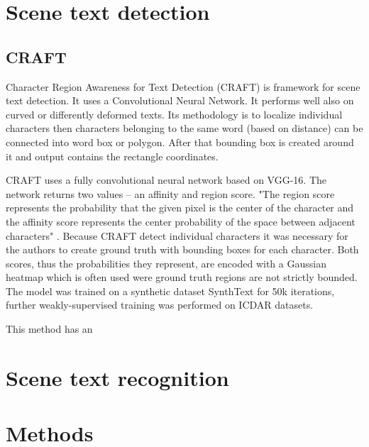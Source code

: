 \section{Scene text detection}

\subsection{CRAFT}

Character Region Awareness for Text Detection (CRAFT) is framework for scene text detection. It uses a Convolutional Neural Network. It performs well also on curved or differently deformed texts. Its methodology is to localize individual characters then characters belonging to the same word (based on distance) can be connected into word box or polygon. After that bounding box is created around it and output contains the rectangle coordinates.\cite{craft2}

CRAFT uses  a fully convolutional neural network based on VGG-16.%
The network returns two values -- an affinity and region score. "The region score represents the probability that the given pixel is the center of the character and the affinity score represents the center probability of the space between adjacent characters" \cite[page 3]{craft2}. Because CRAFT detect individual characters it was necessary for the authors to create ground truth with bounding boxes for each character. Both scores, thus the probabilities they represent, are encoded with a Gaussian heatmap which is often used were ground truth regions are not strictly bounded. The model was trained on a synthetic dataset SynthText for 50k iterations, further weakly-supervised training was performed on ICDAR datasets.\cite{craft2}

This method has an 



\section{Scene text recognition}

\section*{Methods}


